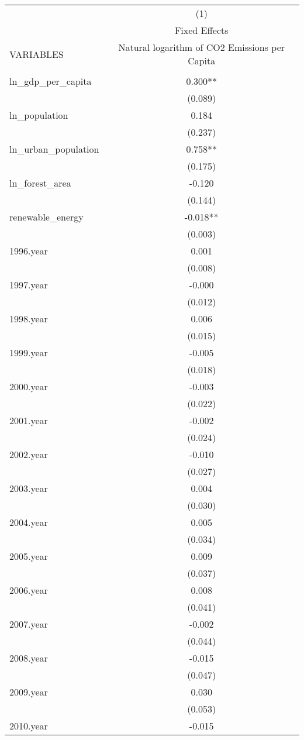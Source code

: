 \begin{tabular}{lc} \hline
 & (1) \\
 & Fixed Effects \\
VARIABLES & Natural logarithm of CO2 Emissions per Capita \\ \hline
 &  \\
ln\_gdp\_per\_capita & 0.300** \\
 & (0.089) \\
ln\_population & 0.184 \\
 & (0.237) \\
ln\_urban\_population & 0.758** \\
 & (0.175) \\
ln\_forest\_area & -0.120 \\
 & (0.144) \\
renewable\_energy & -0.018** \\
 & (0.003) \\
1996.year & 0.001 \\
 & (0.008) \\
1997.year & -0.000 \\
 & (0.012) \\
1998.year & 0.006 \\
 & (0.015) \\
1999.year & -0.005 \\
 & (0.018) \\
2000.year & -0.003 \\
 & (0.022) \\
2001.year & -0.002 \\
 & (0.024) \\
2002.year & -0.010 \\
 & (0.027) \\
2003.year & 0.004 \\
 & (0.030) \\
2004.year & 0.005 \\
 & (0.034) \\
2005.year & 0.009 \\
 & (0.037) \\
2006.year & 0.008 \\
 & (0.041) \\
2007.year & -0.002 \\
 & (0.044) \\
2008.year & -0.015 \\
 & (0.047) \\
2009.year & 0.030 \\
 & (0.053) \\
2010.year & -0.015 \\

\end{tabular}
